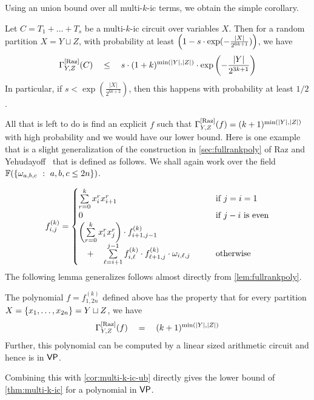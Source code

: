 \noindent
Using an union bound over all multi-$k$-ic terms, we obtain the simple corollary. 

\begin{corollary}\label{cor:multi-k-ic-ub}
Let $C = T_1 + \dots + T_s$ be a multi-$k$-ic circuit over variables $X$. 
Then for a random partition $X = Y \sqcup Z$, with probability at least $\left(1 - s  \cdot \exp(-\frac{|X|}{2^{6k+1}})\right)$, we have
\[
\Gamma^{\mathrm{[Raz]}}_{Y,Z}(C) \quad \leq \quad s \cdot (1+k)^{\min(|Y|,|Z|)}\cdot \exp\left(-\frac{|Y|}{2^{3k+1}}\right)
\]
In particular, if $s < \exp(\frac{|X|}{2^{6k+2}})$, then this happens with probability at least $1/2$. 
\end{corollary}

All that is left to do is find an explicit $f$ such that $\Gamma^{\mathrm{[Raz]}}_{Y,Z}(f) = (k+1)^{\min(|Y|,|Z|)}$ with high probability and we would have our lower bound. 
Here is one example that is a slight generalization of the construction in \autoref{sec:fullrankpoly}  of Raz and Yehudayoff~\cite{ry08} that is defined as follows. 
We shall again work over the field $\mathbb{F}(\left\{{\omega_{a,b,c}}\ : \ {a,b,c\leq 2n}\right\})$. 

\[
f_{i,j}^{(k)} =  \begin{cases}
 \sum\limits_{r=0}^k x_i^r x_{i+1}^r & \text{if $j = i=1$}\\
 0  & \text{if $j -i$ is even}\\
 \left(\sum\limits_{r=0}^k x_i^r x_{j}^r\right) \cdot f_{i+1,j-1}^{(k)} & \\
 \quad + \quad \sum\limits_{\ell=i+1}^{j-1} f_{i,\ell}^{(k)} \cdot f_{\ell+1,j}^{(k)} \cdot \omega_{i,\ell,j}\quad\quad & \text{otherwise} 
\end{cases}
\]
\noindent
The following lemma generalizes follows almost directly from \autoref{lem:fullrankpoly}. 

\begin{lemma}
The polynomial $f = f_{1,2n}^{(k)}$ defined above has the property that for every partition $X = \left\{x_1,\dots, x_{2n}\right\} = Y \sqcup Z$, we have
\[
\Gamma^{\mathrm{[Raz]}}_{Y,Z}(f) \quad = \quad (k+1)^{\min(|Y|,|Z|)}
\]
Further, this polynomial can be computed by a linear sized arithmetic circuit and hence is in $\mathsf{VP}$. 
\end{lemma}

Combining this with \autoref{cor:multi-k-ic-ub} directly gives the lower bound of \autoref{thm:multi-k-ic} for a polynomial in $\mathsf{VP}$. 

